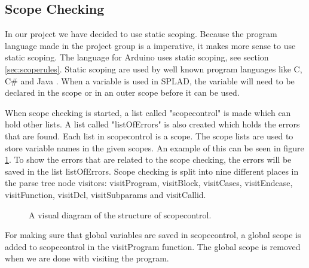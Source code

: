 \subsection{Scope Checking}
\label{sec:scopecheck}
In our project we have decided to use static scoping. Because the program language made in the project group is a imperative, it makes more sense to use static scoping. The language for Arduino uses static scoping, see section \ref{sec:scoperules}. Static scoping are used by well known program languages like C, C\# and Java \citep{ProgrammingCommunityIndex}. When a variable is used in SPLAD, the variable will need to be declared in the scope or in an outer scope before it can be used.

When scope checking is started, a list called "scopecontrol" is made which can hold other lists. A list called "listOfErrors" is also created which holds the errors that are found. Each list in scopecontrol is a scope. The scope lists are used to store variable names in the given scopes. An example of this can be seen in figure \ref{fig:scopediagram}. To show the errors that are related to the scope checking, the errors will be saved in the list listOfErrors. Scope checking is split into nine different places in the parse tree node visitors: visitProgram, visitBlock, visitCases, visitEndcase, visitFunction, visitDcl, visitSubparams and visitCallid.

\begin{figure}[H]

\centering
{}
\caption{A visual diagram of the structure of scopecontrol.}
\label{fig:scopediagram}
\end{figure}

For making sure that global variables are saved in scopecontrol, a global scope is added to scopecontrol in the visitProgram function. The global scope is removed when we are done with visiting the program.

